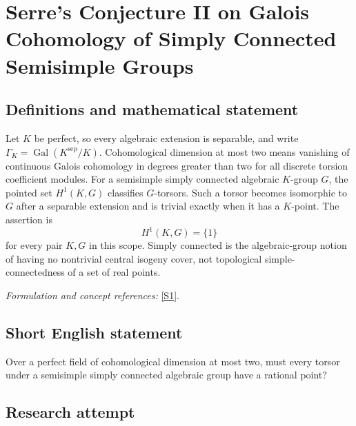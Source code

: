 \documentclass[11pt,a4paper]{article}
\newcommand{\sref}[2]{\hyperlink{source:#1:#2}{[S#2]}}
\newif\ifshowcatalogue
\newcommand{\cataloguescope}[1]{\ifshowcatalogue
 \paragraph{Exact scope in the supplied catalogue.}
 \begin{quote}\small #1\end{quote}\fi}
\numberwithin{equation}{section}
\begin{document}
\setcounter{section}{0}
\clearpage
\section*{\texorpdfstring{Serre's Conjecture II on Galois Cohomology of Simply Connected Semisimple Groups}{Serre's Conjecture II on Galois Cohomology of Simply Connected Semisimple Groups}}\label{30006799}
\subsection{Definitions and mathematical statement}
Let $K$ be perfect, so every algebraic extension is separable, and write $\Gamma_K=\operatorname{Gal}(K^{\mathrm{sep}}/K)$. Cohomological dimension at most two means vanishing of continuous Galois cohomology in degrees greater than two for all discrete torsion coefficient modules. For a semisimple simply connected algebraic $K$-group $G$, the pointed set $H^1(K,G)$ classifies $G$-torsors. Such a torsor becomes isomorphic to $G$ after a separable extension and is trivial exactly when it has a $K$-point. The assertion is
\[
 H^1(K,G)=\{1\}
\]
for every pair $K,G$ in this scope. Simply connected is the algebraic-group notion of having no nontrivial central isogeny cover, not topological simple-connectedness of a set of real points.
\par\smallskip\textit{Formulation and concept references:} \sref{30006799}{1}.
\cataloguescope{Let K be a perfect field of cohomological dimension at most 2. Prove that every principal homogeneous space under a semisimple simply connected linear algebraic K-group has a rational point, i.e. H\textasciicircum{}1(K,G) = 1 for every such group G.}
\subsection{Short English statement}
Over a perfect field of cohomological dimension at most two, must every torsor under a semisimple simply connected algebraic group have a rational point?
\subsection{Research attempt}
\end{document}
